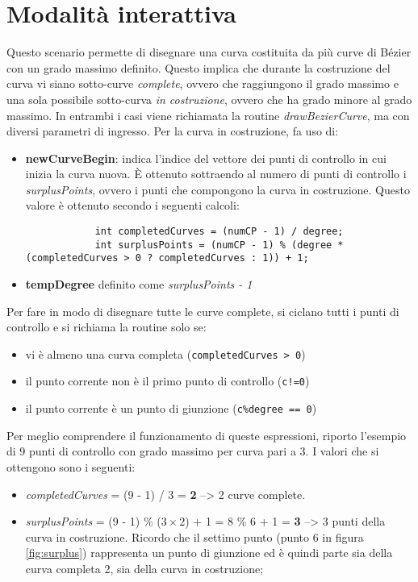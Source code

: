 \newpage


\section{Modalità interattiva}
\label{interactive}
Questo scenario permette di disegnare una curva costituita da più curve di Bézier con un grado massimo definito. Questo implica che durante la costruzione del curva vi siano sotto-curve \textit{complete}, ovvero che raggiungono il grado massimo e una sola possibile sotto-curva \textit{in costruzione}, ovvero che ha grado minore al grado massimo. In entrambi i casi viene richiamata la routine \textit{drawBezierCurve}, ma con diversi parametri di ingresso. Per la curva in costruzione, fa uso di:
\begin{itemize}
  \item \textbf{newCurveBegin}: indica l'indice del vettore dei punti di controllo in cui inizia la curva nuova. È ottenuto sottraendo al numero di punti di controllo i \textit{surplusPoints}, ovvero i punti che compongono la curva in costruzione. Questo valore è ottenuto secondo i seguenti calcoli:
		 \begin{lstlisting}
		 	int completedCurves = (numCP - 1) / degree;
			int surplusPoints = (numCP - 1) % (degree * (completedCurves > 0 ? completedCurves : 1)) + 1;
		 \end{lstlisting}
  \item \textbf{tempDegree} definito come \textit{surplusPoints - 1}
\end{itemize}

Per fare in modo di disegnare tutte le curve complete, si ciclano tutti i punti di controllo e si richiama la routine solo se:
\begin{itemize}
  \item vi è almeno una curva completa (\texttt{completedCurves > 0})
  \item il punto corrente non è il primo punto di controllo (\texttt{c!=0})
  \item il punto corrente è un punto di giunzione (\texttt{c\%degree == 0}) 
  \end{itemize}


 Per meglio comprendere il funzionamento di queste espressioni, riporto l'esempio di 9 punti di controllo con grado massimo per curva pari a 3. 
 I valori che si ottengono sono i seguenti:
\begin{itemize}
  \item \textit{completedCurves} = (9 - 1) / 3 = \textbf{2} --> 2 curve complete.
  \item \textit{surplusPoints} = (9 - 1) \% ($3 \times 2$) + 1 = 8 \% 6 + 1 = \textbf{3} --> 3 punti della curva in costruzione. Ricordo che il settimo punto (punto 6 in figura \ref{fig:surplus}) rappresenta un punto di giunzione ed è quindi parte sia della curva completa 2, sia della curva in costruzione;
\end{itemize}

